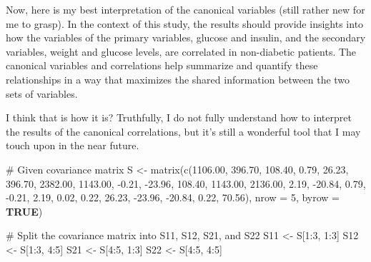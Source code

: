 \documentclass[
  letterpaper,
  DIV=11,
  numbers=noendperiod]{scrartcl}
\newenvironment{Shaded}{}{}
\newcommand{\AttributeTok}[1]{\textcolor[rgb]{0.84,0.60,0.13}{#1}}
\newcommand{\CommentTok}[1]{\textcolor[rgb]{0.57,0.51,0.45}{#1}}
\newcommand{\ConstantTok}[1]{\textcolor[rgb]{0.69,0.38,0.53}{\textbf{#1}}}
\newcommand{\DecValTok}[1]{\textcolor[rgb]{0.96,0.45,0.00}{#1}}
\newcommand{\FloatTok}[1]{\textcolor[rgb]{0.96,0.45,0.00}{#1}}
\newcommand{\FunctionTok}[1]{\textcolor[rgb]{0.41,0.62,0.42}{#1}}
\newcommand{\NormalTok}[1]{\textcolor[rgb]{0.24,0.22,0.21}{#1}}
\newcommand{\OtherTok}[1]{\textcolor[rgb]{0.41,0.62,0.42}{#1}}
\newcommand{\SpecialCharTok}[1]{\textcolor[rgb]{0.69,0.38,0.53}{#1}}
\begin{document}
Now, here is my best interpretation of the canonical variables (still
rather new for me to grasp). In the context of this study, the results
should provide insights into how the variables of the primary variables,
glucose and insulin, and the secondary variables, weight and glucose
levels, are correlated in non-diabetic patients. The canonical variables
and correlations help summarize and quantify these relationships in a
way that maximizes the shared information between the two sets of
variables.

I think that is how it is? Truthfully, I do not fully understand how to
interpret the results of the canonical correlations, but it's still a
wonderful tool that I may touch upon in the near future.

\begin{Shaded}
\begin{Highlighting}[]
\CommentTok{\# Given covariance matrix}
\NormalTok{S }\OtherTok{\textless{}{-}} \FunctionTok{matrix}\NormalTok{(}\FunctionTok{c}\NormalTok{(}\FloatTok{1106.00}\NormalTok{, }\FloatTok{396.70}\NormalTok{, }\FloatTok{108.40}\NormalTok{, }\FloatTok{0.79}\NormalTok{, }\FloatTok{26.23}\NormalTok{,}
              \FloatTok{396.70}\NormalTok{, }\FloatTok{2382.00}\NormalTok{, }\FloatTok{1143.00}\NormalTok{, }\SpecialCharTok{{-}}\FloatTok{0.21}\NormalTok{, }\SpecialCharTok{{-}}\FloatTok{23.96}\NormalTok{,}
              \FloatTok{108.40}\NormalTok{, }\FloatTok{1143.00}\NormalTok{, }\FloatTok{2136.00}\NormalTok{, }\FloatTok{2.19}\NormalTok{, }\SpecialCharTok{{-}}\FloatTok{20.84}\NormalTok{,}
              \FloatTok{0.79}\NormalTok{, }\SpecialCharTok{{-}}\FloatTok{0.21}\NormalTok{, }\FloatTok{2.19}\NormalTok{, }\FloatTok{0.02}\NormalTok{, }\FloatTok{0.22}\NormalTok{,}
              \FloatTok{26.23}\NormalTok{, }\SpecialCharTok{{-}}\FloatTok{23.96}\NormalTok{, }\SpecialCharTok{{-}}\FloatTok{20.84}\NormalTok{, }\FloatTok{0.22}\NormalTok{, }\FloatTok{70.56}\NormalTok{), }\AttributeTok{nrow =} \DecValTok{5}\NormalTok{, }\AttributeTok{byrow =} \ConstantTok{TRUE}\NormalTok{)}

\CommentTok{\# Split the covariance matrix into S11, S12, S21, and S22}
\NormalTok{S11 }\OtherTok{\textless{}{-}}\NormalTok{ S[}\DecValTok{1}\SpecialCharTok{:}\DecValTok{3}\NormalTok{, }\DecValTok{1}\SpecialCharTok{:}\DecValTok{3}\NormalTok{]}
\NormalTok{S12 }\OtherTok{\textless{}{-}}\NormalTok{ S[}\DecValTok{1}\SpecialCharTok{:}\DecValTok{3}\NormalTok{, }\DecValTok{4}\SpecialCharTok{:}\DecValTok{5}\NormalTok{]}
\NormalTok{S21 }\OtherTok{\textless{}{-}}\NormalTok{ S[}\DecValTok{4}\SpecialCharTok{:}\DecValTok{5}\NormalTok{, }\DecValTok{1}\SpecialCharTok{:}\DecValTok{3}\NormalTok{]}
\NormalTok{S22 }\OtherTok{\textless{}{-}}\NormalTok{ S[}\DecValTok{4}\SpecialCharTok{:}\DecValTok{5}\NormalTok{, }\DecValTok{4}\SpecialCharTok{:}\DecValTok{5}\NormalTok{]}


\end{Highlighting}
\end{Shaded}
\end{document}
